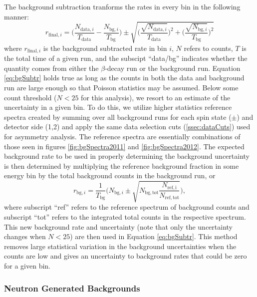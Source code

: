The background subtraction tranforms the rates in every bin in the following manner:
%
\begin{equation} \label{eq:bgSubtr}
  r_{\mathrm{final},i} =  \Bigg( \frac{N_{\mathrm{data},i}}{T_{\mathrm{data}}}-\frac{N_{\mathrm{bg},i}}{T_{\mathrm{bg}}} \Bigg) \pm
  \sqrt{\bigg(\frac{\sqrt{N_{\mathrm{data},i}}}{T_{\mathrm{data}}}\bigg)^2+\bigg(\frac{\sqrt{N_{\mathrm{bg},i}}}{T_{\mathrm{bg}}}\bigg)^2}
\end{equation}
%
\noindent where $r_{\mathrm{final},i}$ is the background subtracted
rate in bin $i$, $N$ refers to counts, $T$ is the total time of
a given run, and the subscipt ``data/bg'' indicates whether the
quantity comes from either the $\beta$-decay run or the
background run. Equation \ref{eq:bgSubtr} holds true
as long as the counts in both the data and background run are large enough so that
Poisson statistics may be assumed. Below some count threshold ($N<25$ for this analysis),
we resort to an estimate of the uncertainty in a given bin. To do this, we utilize
higher statistics reference spectra created by summing over all background runs for each
spin state ($\pm$) and detector side (1,2) and apply the same data selection cuts
(\ref{ssec:dataCuts}) used for asymmetry analysis. The reference spectra are essentially combinations
of those seen in figures \ref{fig:bgSpectra2011} and \ref{fig:bgSpectra2012}. The expected
background rate to be used in properly determining the background uncertainty
is then determined by multiplying the reference background fraction in some energy bin
by the total background counts in the background run, or
%
\begin{equation} \label{eq:bgRef}
  r_{\mathrm{bg},i} =  \frac{1}{T_{\mathrm{bg}}} \Bigg(N_{\mathrm{bg},i} \pm
  \sqrt{N_{\mathrm{bg,tot}} \frac{N_{\mathrm{ref,i}}}{N_{\mathrm{ref,tot}}} } \Bigg), 
\end{equation}
%
\noindent where subscript ``ref'' refers to the reference spectrum of background counts and
subscript ``tot'' refers to the integrated total counts in the respective spectrum. This new
background rate and uncertainty (note that only the uncertainty changes when $N<25$) are then
used in Equation \ref{eq:bgSubtr}. This method
removes large statistical variation in the background uncertainties when the counts
are low and gives an uncertainty
to background rates that could be zero for a given bin. 

\subsubsection{Neutron Generated Backgrounds}

